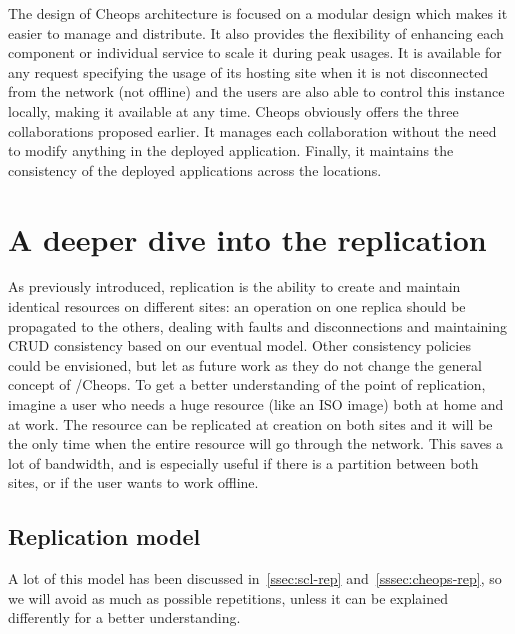 The design of Cheops architecture is focused on a modular design
which makes it easier to manage and distribute.
%
It also provides the flexibility of enhancing each component or
individual service to scale it during peak usages.
%
It is available for any request specifying the usage of its hosting
site when it is not disconnected from the network (not offline) and
the users are also able to control this instance locally, making it
available at any time.
%
Cheops obviously offers the three collaborations proposed earlier.
%
It manages each collaboration without the need to modify anything in
the deployed application.
%
Finally, it maintains the consistency of the deployed applications
across the locations.







\section{A deeper dive into the replication}
\label{sec:cheops-replication}



As previously introduced, replication is the ability to create and
maintain identical resources on different sites: an operation on one
replica should be propagated to the others, dealing with faults and
disconnections and maintaining CRUD consistency based on our eventual
model.
%
Other consistency policies~\cite{ATB+16, ZW15} could be envisioned,
but let as future work as they do not change the general concept of
\scl/Cheops.
%
To get a better understanding of the point of replication, imagine a
user who needs a huge resource (like an ISO image) both at home and at
work.
%
The resource can be replicated at creation on both sites and it will
be the only time when the entire resource will go through the network.
%
This saves a lot of bandwidth, and is especially useful if there is a
partition between both sites, or if the user wants to work offline.


\subsection{Replication model}

A lot of this model has been discussed in~\autoref{ssec:scl-rep}
and~\autoref{sssec:cheops-rep}, so we will avoid as much as possible
repetitions, unless it can be explained differently for a better
understanding.

